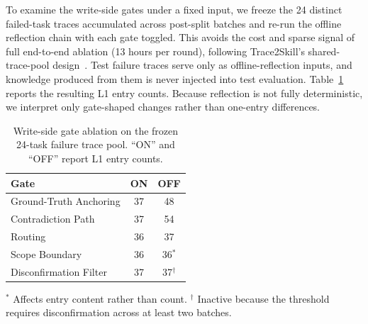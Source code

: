 To examine the write-side gates under a fixed input, we freeze the 24 distinct failed-task traces accumulated across post-split batches and re-run the offline reflection chain with each gate toggled. This avoids the cost and sparse signal of full end-to-end ablation (13 hours per round), following Trace2Skill's shared-trace-pool design~\cite{ni2026trace2skill}. Test failure traces serve only as offline-reflection inputs, and knowledge produced from them is never injected into test evaluation. Table~\ref{tab:se_write_ablation} reports the resulting L1 entry counts. Because reflection is not fully deterministic, we interpret only gate-shaped changes rather than one-entry differences.

\begin{table}[ht]
\caption{Write-side gate ablation on the frozen 24-task failure trace pool.
``ON'' and ``OFF'' report L1 entry counts.}
\label{tab:se_write_ablation}
\centering
\begin{tabular}{lcc}
\toprule
Gate & ON & OFF \\
\midrule
Ground-Truth Anchoring   & 37 & 48 \\
Contradiction Path       & 37 & 54 \\
Routing                  & 36 & 37 \\
Scope Boundary           & 36 & 36$^{*}$ \\
Disconfirmation Filter   & 37 & 37$^{\dagger}$ \\
\bottomrule
\end{tabular}

\vspace{2pt}
{\footnotesize\raggedright
$^{*}$ Affects entry content rather than count.
$^{\dagger}$ Inactive because the threshold requires disconfirmation
across at least two batches.\par}
\end{table}

